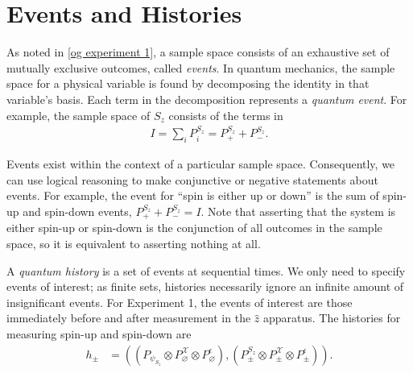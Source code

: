 \section{Events and Histories} \label{events}

%

As noted in \autoref{og experiment 1}, a sample space consists of an exhaustive set of mutually exclusive outcomes, called \textit{events}. In quantum mechanics, the sample space for a physical variable is found by decomposing the identity in that variable's basis. Each term in the decomposition represents a \textit{quantum event}. For example, the sample space of $S_z$ consists of the terms in
\begin{align}
  I = \sum_i P^{S_z}_i = P^{S_z}_+ + P^{S_z}_-.
\end{align}

Events exist within the context of a particular sample space. Consequently, we can use logical reasoning to make conjunctive or negative statements about events. For example, the event for ``spin is either up or down'' is the sum of spin-up and spin-down events, $P^{S_z}_+ + P^{S_z}_- = I$. Note that asserting that the system is either spin-up or spin-down is the conjunction of all outcomes in the sample space, so it is equivalent to asserting nothing at all.

A \textit{quantum history} is a set of events at sequential times. We only need to specify events of interest; as finite sets, histories necessarily ignore an infinite amount of insignificant events. For Experiment 1, the events of interest are those immediately before and after measurement in the $\hat{z}$ apparatus. The histories for measuring spin-up and spin-down are
\begin{align}
  h_\pm &= \left( \left(P_{\psi_{S_z}} \otimes P^\mathcal{X}_\varnothing \otimes P^\epsilon_\varnothing \right), \left(P^{S_z}_\pm \otimes P^\mathcal{X}_\pm \otimes P^\epsilon_\pm \right)  \right).
\end{align}

